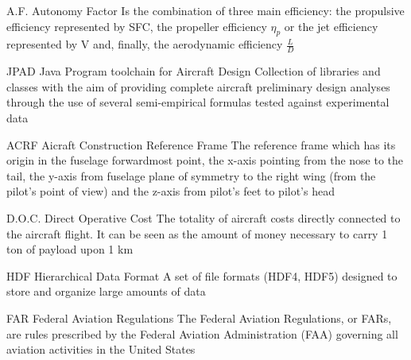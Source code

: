 %
%



  {A.F.}            %
  {Autonomy Factor}  %
  {Is the combination of three main efficiency: the propulsive efficiency represented by SFC, the propeller efficiency $\eta_{p}$ or the jet efficiency represented by V and, finally, the aerodynamic efficiency $\frac{L}{D}$} %

  {JPAD}            %
  {Java Program toolchain for Aircraft Design}  %
  {Collection of libraries and classes with the aim of providing complete aircraft preliminary design analyses through the use of several semi-empirical formulas tested against experimental data} %

  {ACRF}            %
  {Aicraft Construction Reference Frame}  %
  {The reference frame which has its origin in the fuselage forwardmost point, the x-axis pointing from the nose to the tail, the y-axis from fuselage plane of symmetry to the right wing (from the pilot's point of view) and the z-axis from pilot's feet to pilot's head} %

%
  {D.O.C.}            %
  {Direct Operative Cost}  %
  {The totality of aircraft costs directly connected to the aircraft flight. It can be seen as the amount of money necessary to carry 1 ton of payload upon 1 km}

%
  {HDF}            %
  {Hierarchical Data Format}  %
  {A set of file formats (HDF4, HDF5) designed to store and organize large amounts of data}
  
%
 {FAR}            %
 {Federal Aviation Regulations}  %
 {The Federal Aviation Regulations, or FARs, are rules prescribed by the Federal Aviation Administration (FAA) governing all aviation activities in the United States}
  

